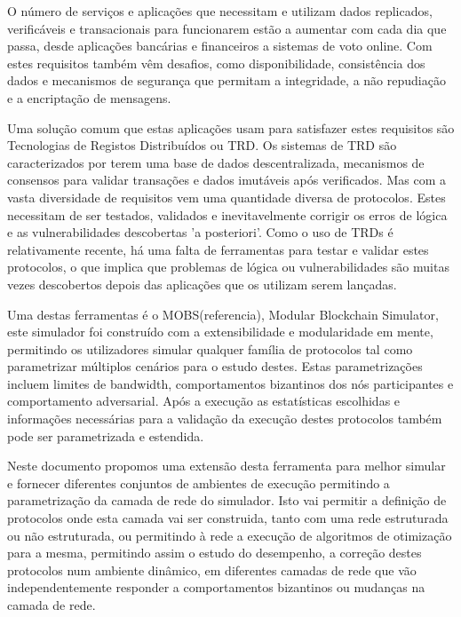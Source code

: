 
%

O número de serviços e aplicações que necessitam e utilizam dados replicados, verificáveis e transacionais para funcionarem estão a aumentar
com cada dia que passa, desde aplicações bancárias e financeiros a sistemas de voto online. Com estes requisitos também vêm desafios,
como disponibilidade, consistência dos dados e mecanismos de segurança que permitam a integridade, a não repudiação e a encriptação de mensagens.

Uma solução comum que estas aplicações usam para satisfazer estes requisitos são Tecnologias de Registos Distribuídos ou TRD. Os sistemas de TRD
são caracterizados por terem uma base de dados descentralizada, mecanismos de consensos para  validar transações e dados imutáveis após verificados.
Mas com a vasta diversidade de requisitos vem uma quantidade diversa de protocolos. Estes necessitam de ser testados, validados e inevitavelmente 
corrigir os erros de lógica e as vulnerabilidades descobertas 'a posteriori'. Como o uso de TRDs é relativamente recente, há uma falta de ferramentas para
testar e validar estes protocolos, o que implica que problemas de lógica ou vulnerabilidades são muitas vezes descobertos depois das aplicações que os utilizam
serem lançadas.

Uma destas ferramentas é o MOBS(referencia), Modular Blockchain Simulator, este simulador foi construído com a extensibilidade e modularidade em mente,
permitindo os utilizadores simular qualquer família de protocolos tal como parametrizar múltiplos cenários para o estudo destes. Estas parametrizações incluem
limites de bandwidth, comportamentos bizantinos dos nós participantes e comportamento adversarial. Após a execução as estatísticas escolhidas e informações
necessárias para a validação da execução destes protocolos também pode ser parametrizada e estendida.

Neste documento propomos uma extensão desta ferramenta para melhor simular e fornecer diferentes conjuntos de ambientes de execução
permitindo a parametrização da camada de rede do simulador. Isto vai permitir a definição de protocolos onde esta camada vai ser construida, 
tanto com uma rede estruturada ou não estruturada, ou permitindo à rede a execução de algoritmos de otimização para a mesma, permitindo assim o estudo
do desempenho, a correção destes protocolos num ambiente dinâmico, em diferentes camadas de rede que vão independentemente responder a comportamentos
bizantinos ou mudanças na camada de rede.

